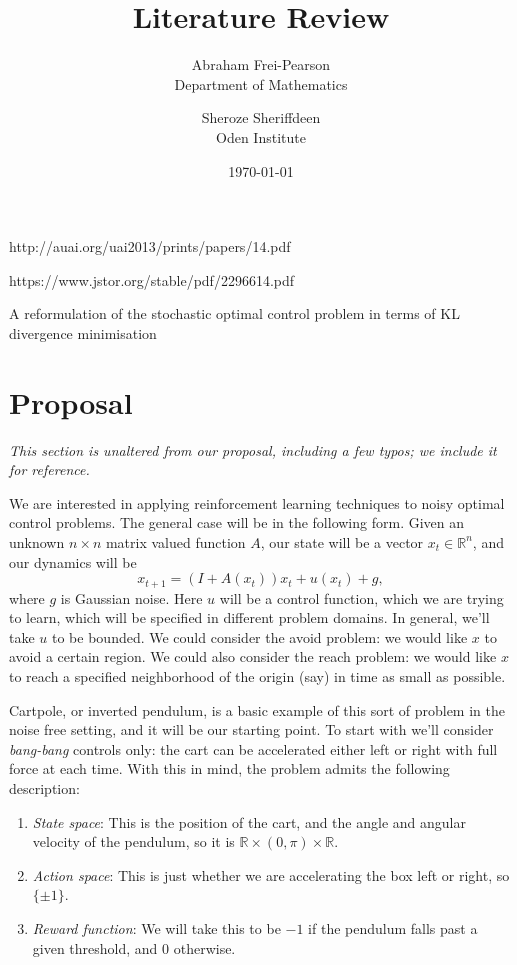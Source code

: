 \documentclass{article}
\title{Literature Review}
\author{Abraham Frei-Pearson \\
	Department of Mathematics  \\
	\and 
	Sheroze Sheriffdeen \\
	Oden Institute \\
	}
\date{\today}
\begin{document}
\maketitle

http://auai.org/uai2013/prints/papers/14.pdf

https://www.jstor.org/stable/pdf/2296614.pdf

A reformulation of the stochastic optimal control problem in terms of KL divergence minimisation \cite{rawlik2013stochastic}

\section{Proposal}

{\em This section is unaltered from our proposal, including a few typos; we include it for reference.}

We are interested in applying reinforcement learning techniques to noisy optimal control problems. The general case will be in the following form. Given an unknown $n \times n$ matrix valued function $A$, our state will be a vector $x_t \in \mathbb R^n$, and our dynamics will be
\[
    x_{t+1} = (I + A(x_t)) x_t + u(x_t) + g,
\]
where $g$ is Gaussian noise. Here $u$ will be a control function, which we are trying to learn, which will be specified in different problem domains. In general, we'll take $u$ to be bounded. We could consider the avoid problem: we would like $x$ to avoid a certain region. We could also consider the reach problem: we would like $x$ to reach a specified neighborhood of the origin (say) in time as small as possible.

Cartpole, or inverted pendulum, is a basic example of this sort of problem in the noise free setting, and it will be our starting point. To start with we'll consider {\em bang-bang} controls only: the cart can be accelerated either left or right with full force at each time. With this in mind, the problem admits the following description:
\begin{enumerate}
    \item []{\em State space}: This is the position of the cart, and the angle and angular velocity of the pendulum, so it is $\mathbb R \times (0,\pi) \times \mathbb R$.
    \item []{\em Action space}: This is just whether we are accelerating the box left or right, so $\{\pm 1\}$.
    \item []{\em Reward function}: We will take this to be $-1$ if the pendulum falls past a given threshold, and $0$ otherwise.
\end{enumerate}
\end{document}
